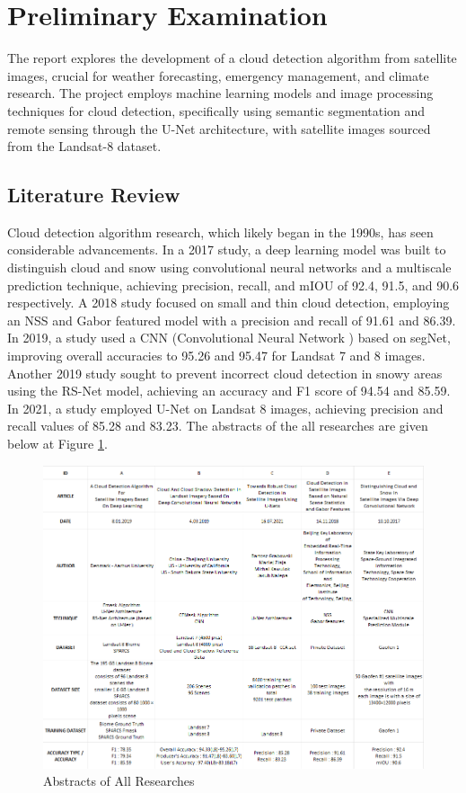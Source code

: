 \documentclass[conference]{IEEEtran}
\begin{document}
\section{Preliminary Examination}
The report explores the development of a cloud detection algorithm from satellite images, crucial for weather forecasting, emergency management, and climate research. The project employs machine learning models and image processing techniques for cloud detection, specifically using semantic segmentation and remote sensing through the U-Net architecture, with satellite images sourced from the Landsat-8 dataset.

\subsection{Literature Review}

Cloud detection algorithm research, which likely began in the 1990s, has seen considerable advancements. \cite{first} In a 2017 study, a deep learning model was built to distinguish cloud and snow using convolutional neural networks and a multiscale prediction technique, achieving precision, recall, and mIOU of 92.4, 91.5, and 90.6 respectively. \cite{second} A 2018 study focused on small and thin cloud detection, employing an NSS and Gabor featured model with a precision and recall of 91.61 and 86.39. \cite{third} In 2019, a study used a CNN (Convolutional Neural Network ) based on segNet, improving overall accuracies to 95.26 and 95.47 for Landsat 7 and 8 images. \cite{fourth} Another 2019 study sought to prevent incorrect cloud detection in snowy areas using the RS-Net model, achieving an accuracy and F1 score of 94.54 and 85.59. \cite{fifth} In 2021, a study employed U-Net on Landsat 8 images, achieving precision and recall values of 85.28 and 83.23.
\newpage
The abstracts of the all researches are given below at Figure \ref{lit_rew}.
\begin{figure}[htp]
    \centering
    \includegraphics[scale=0.3]{images/litareture.png}
    \caption{Abstracts of All Researches}
    \label{lit_rew}
\end{figure}
\end{document}
